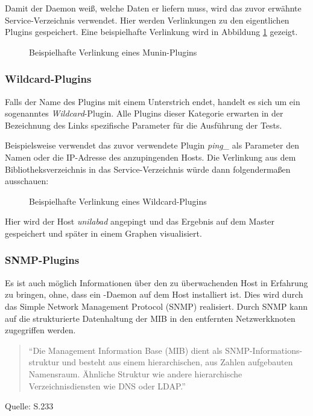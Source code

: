 Damit der Daemon weiß, welche Daten er liefern muss, wird das zuvor erwähnte Service-Verzeichnis verwendet.
Hier werden Verlinkungen zu den eigentlichen Plugins gespeichert.
Eine beispielhafte Verlinkung wird in Abbildung \ref{lns} gezeigt.

\begin{figure}[ht]
	\centering
		\caption{Beispielhafte Verlinkung eines Munin-Plugins}
		\label{lns}
\end{figure}

\subsubsection{Wildcard-Plugins}
\label{wildcard}
Falls der Name des Plugins mit einem Unterstrich endet, handelt es sich um ein sogenanntes \textit{Wildcard}-Plugin.
Alle Plugins dieser Kategorie erwarten in der Bezeichnung des Links spezifische Parameter für die Ausführung der Tests.

Beispielsweise verwendet das zuvor verwendete Plugin \textit{ping\_} als Parameter den Namen oder die IP-Adresse des anzupingenden Hosts.
Die Verlinkung aus dem Bibliotheksverzeichnis in das Service-Verzeichnis würde dann folgendermaßen ausschauen:
\begin{figure}[ht]
	\centering
		\caption{Beispielhafte Verlinkung eines Wildcard-Plugins}
		\label{lnw}
\end{figure}

Hier wird der Host \textit{unilabad} angepingt und das Ergebnis auf dem Master gespeichert und später in einem Graphen visualisiert.

\newpage

\subsubsection{SNMP-Plugins}
Es ist auch möglich Informationen über den zu überwachenden Host in Erfahrung zu bringen, ohne, dass ein -Daemon auf dem Host installiert ist.
Dies wird durch das Simple Network Management Protocol (SNMP) realisiert.
Durch SNMP kann auf die strukturierte Datenhaltung der MIB in den entfernten Netzwerkknoten zugegriffen werden.
\begin{quote}"`Die Management Information Base (MIB) dient als SNMP-Informations-struktur und besteht aus einem hierarchischen, aus Zahlen aufgebauten Namensraum. Ähnliche Struktur wie andere hierarchische Verzeichnisdiensten wie DNS oder LDAP."'\end{quote}
\begin{flushright}
Quelle: \cite{Barth08} S.233
\end{flushright}


